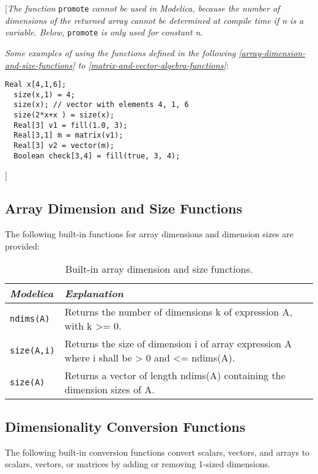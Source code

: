 {[}\emph{The function} \lstinline!promote! \emph{cannot be used in Modelica, because
the number of dimensions of the returned array cannot be determined at
compile time if n is a variable. Below,} \lstinline!promote! \emph{is only used for
constant n}.

\emph{Some examples of using the functions defined in the following
\autoref{array-dimension-and-size-functions} to \autoref{matrix-and-vector-algebra-functions}}:

\begin{lstlisting}[language=modelica]
  Real x[4,1,6];
  size(x,1) = 4;
  size(x); // vector with elements 4, 1, 6
  size(2*x+x ) = size(x);
  Real[3] v1 = fill(1.0, 3);
  Real[3,1] m = matrix(v1);
  Real[3] v2 = vector(m);
  Boolean check[3,4] = fill(true, 3, 4);
\end{lstlisting}
{]}

\subsection{Array Dimension and Size Functions}

The following built-in functions for array dimensions and dimension
sizes are provided:

\begin{longtable}[]{|l|p{9cm}|}
\caption{Built-in array dimension and size functions.}\\
\hline
\emph{Modelica} & \emph{Explanation}\\ \hline
\endhead
\lstinline!ndims(A)! &
Returns the number of dimensions k of expression A, with k
\textgreater{}= 0.
\\ \hline
\lstinline!size(A,i)! &
Returns the size of dimension i of array expression A where i shall be
\textgreater{} 0 and \textless{}= ndims(A).\\ \hline
\lstinline!size(A)! &
Returns a vector of length ndims(A) containing the dimension sizes of
A.\\ \hline
\end{longtable}

\subsection{Dimensionality Conversion Functions}

The following built-in conversion functions convert scalars, vectors,
and arrays to scalars, vectors, or matrices by adding or removing
1-sized dimensions.

